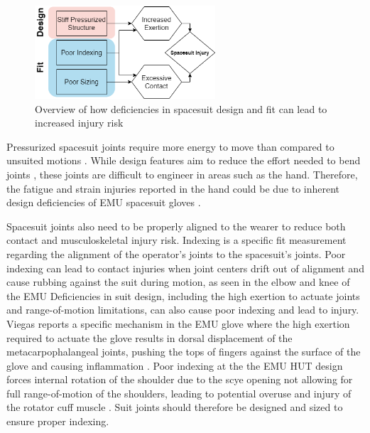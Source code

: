 \documentclass[defaultstyle,11pt]{comps}
\begin{document}
\begin{figure}
\hypertarget{fig:B-fitflow}{%
\centering
\includegraphics[width=0.6\textwidth,height=\textheight]{../fig/Background/fitflow.PNG}
\caption{Overview of how deficiencies in spacesuit design and fit can lead to increased injury risk}\label{fig:B-fitflow}
}
\end{figure}

Pressurized spacesuit joints require more energy to move than compared to unsuited motions \citep{Newman1997, Amick2015}.
While design features aim to reduce the effort needed to bend joints \citep{Harris2001}, these joints are difficult to engineer in areas such as the hand.
Therefore, the fatigue and strain injuries reported in the hand could be due to inherent design deficiencies of EMU spacesuit gloves \citep{Strauss2004, Viegas2004}.

Spacesuit joints also need to be properly aligned to the wearer to reduce both contact and musculoskeletal injury risk.
Indexing is a specific fit measurement regarding the alignment of the operator's joints to the spacesuit's joints.
Poor indexing can lead to contact injuries when joint centers drift out of alignment and cause rubbing against the suit during motion, as seen in the elbow and knee of the EMU \citep{Strauss2004}
Deficiencies in suit design, including the high exertion to actuate joints and range-of-motion limitations, can also cause poor indexing and lead to injury.
Viegas reports a specific mechanism in the EMU glove where the high exertion required to actuate the glove results in dorsal displacement of the metacarpophalangeal joints, pushing the tops of fingers against the surface of the glove and causing inflammation \citep{Viegas2004}.
Poor indexing at the the EMU HUT design forces internal rotation of the shoulder due to the scye opening not allowing for full range-of-motion of the shoulders, leading to potential overuse and injury of the rotator cuff muscle \citep{Williams2003, Strauss2004, Strauss2005, Scheuring2012}.
Suit joints should therefore be designed and sized to ensure proper indexing.
\end{document}
